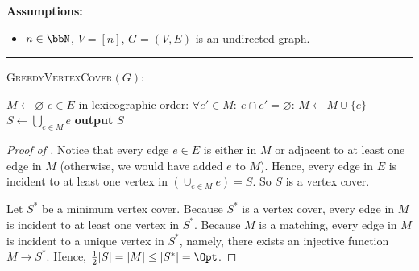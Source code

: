 \begin{algorithmFloat}[H]
	\begin{ShadedAlgorithmBox}
		{\bfseries Assumptions:} 
		\begin{itemize}
			\item{
				$n \in \bbN$, $V = [n]$, $G = (V,E)$ is an undirected graph.
			}
		\end{itemize}
		
		\noindent\rule{\textwidth}{0.5pt}
		
		\vspace*{0.5em}
		
		\textsc{GreedyVertexCover}$(G)$:
		\begin{algorithmic}
			\vsp
			\State $M \gets \varnothing$
			\vsp
			\For $e \in E$ in lexicographic order:
				\If $\forall e' \in M: ~ e \cap e' = \varnothing$:
					\State $M \gets M \cup \{e\}$
				\EndIf
			\EndFor
			\vsp
			\State $S \gets \bigcup_{e \in M}e$
			\vsp
			\State \textbf{output} $S$
		\end{algorithmic}
	\end{ShadedAlgorithmBox}
	
	\caption{A greedy $2$-approximation algorithm for the vertex cover problem.}
	\label{algorithm:vertex-cover}
\end{algorithmFloat}


\begin{proof}[Proof of ]
	Notice that every edge $e \in E$ is either in $M$ or adjacent to at least one edge in $M$ (otherwise, we would have added $e$ to $M$). Hence, every edge in $E$ is incident to at least one vertex in $(\cup_{e \in M}e) = S$. So $S$ is a vertex cover.

	Let $S^*$ be a minimum vertex cover. Because $S^*$ is a vertex cover, every edge in $M$ is incident to at least one vertex in $S^*$. Because $M$ is a matching, every edge in $M$ is incident to a unique vertex in $S^*$, namely, there exists an injective function $M \to S^*$. Hence, $\frac{1}{2}|S| = |M| \leq |S^*| = \Opt$.
\end{proof}

